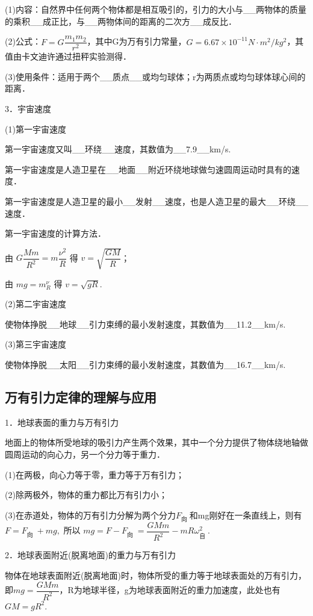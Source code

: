 (1)内容：自然界中任何两个物体都是相互吸引的，引力的大小与\_\_两物体的质量的乘积\_\_成正比，与\_\_两物体间的距离的二次方\_\_成反比．

(2)公式：$F=G\dfrac{m_1m_2}{r^2}$，其中G为万有引力常量，$G=6.67\times 10^{-11} N·m^2/kg^2$，其值由卡文迪许通过扭秤实验测得．

(3)使用条件：适用于两个\_\_质点\_\_或均匀球体；r为两质点或均匀球体球心间的距离．

3．宇宙速度

(1)第一宇宙速度

第一宇宙速度又叫\_\_环绕\_\_速度，其数值为\_\_7.9\_\_km/s.

第一宇宙速度是人造卫星在\_\_地面\_\_附近环绕地球做匀速圆周运动时具有的速度．

第一宇宙速度是人造卫星的最小\_\_发射\_\_速度，也是人造卫星的最大\_\_环绕\_\_速度．

第一宇宙速度的计算方法．

由 $G \dfrac{M m}{R^{2}}=m \dfrac{\nu^{2}}{R}$ 得 $v=\sqrt{\dfrac{G M}{R}}$；

由 $m g=m_{R}^{\nu}$ 得 $v=\sqrt{g R}$.

(2)第二宇宙速度

使物体挣脱\_\_地球\_\_引力束缚的最小发射速度，其数值为\_\_11.2\_\_km/s.

(3)第三宇宙速度

使物体挣脱\_\_太阳\_\_引力束缚的最小发射速度，其数值为\_\_16.7\_\_km/s.

\newpage
\subsection{万有引力定律的理解与应用}

1．地球表面的重力与万有引力

地面上的物体所受地球的吸引力产生两个效果，其中一个分力提供了物体绕地轴做圆周运动的向心力，另一个分力等于重力．

(1)在两极，向心力等于零，重力等于万有引力；

(2)除两极外，物体的重力都比万有引力小；

(3)在赤道处，物体的万有引力分解为两个分力$F_{\text {向 }}$和mg刚好在一条直线上，则有$F=F_{\text {向 }}+m g,$ 所以 $m g=F-F_{\text {向 }}=\dfrac{G M m}{R^{2}}-m R \omega_{\text {自 }}^{2}$.

2．地球表面附近(脱离地面)的重力与万有引力

物体在地球表面附近(脱离地面)时，物体所受的重力等于地球表面处的万有引力，即$m g=\dfrac{G M m}{R^{2}}$，R为地球半径，g为地球表面附近的重力加速度，此处也有$G M=g R^{2}$.

